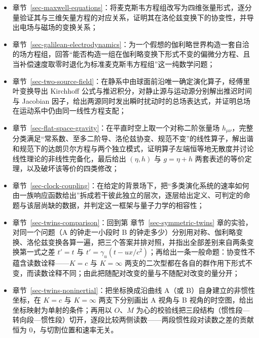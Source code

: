 \documentclass[
  chinese,
  a4paper,
  UTF8,
  12pt,
  oneside,
  openany]{ctexbook}
\theoremstyle{plain}
\theoremstyle{plain}
\theoremstyle{plain}
\theoremstyle{definition}
\theoremstyle{plain}
\theoremstyle{plain}
\theoremstyle{remark}
\begin{document}
\begin{itemize}
  章节~\ref{sec-quantum-phase}：只走纯量子相态------取定
  \(K\to\infty\)、\(\vec\nabla K=0\)，从恒速群出发，经李代数收缩、射影表示与中央扩张推出量子力学的核心骨架：静能
  \(mK^{2}\) 的发散与结构常数 \(1/K^{2}\)
  的消失相抵，产生唯一的中央扩张（\(H^{2}(\mathfrak{gal},\mathbb R)=\mathbb R\)，代表元
  \(c(\hat B_i,\hat P_j)=\delta_{ij}\)），中央荷即质量
  \(m\)（中心元素而非 Casimir 本征值，由此得质量超选择），位置算符定义为
  boost 生成元每单位质量，解出
  \([\hat q_i,\hat P_j]=i\hbar\delta_{ij}\)；再由
  Casimir、不变波动方程的相位抽取、德布罗意色散关系三条独立路线生成薛定谔方程；最后以反证法收口------Jacobi
  恒等式要求中央扩张存在当且仅当 \(\vec\nabla K=0\)，且
  \(\vec\nabla K\neq0\) 时相位抽取的残留项按 \(K_0^{2}\)
  发散并破坏幺正性，量子力学与引力是定义域不相交的两个相态；
\item
  章节~\ref{sec-maxwell-equations}：将麦克斯韦方程组改写为四维张量形式，逐分量验证其与三维矢量方程的对应关系，证明其在洛伦兹变换下的协变性，并导出电场与磁场的变换关系；
\item
  章节~\ref{sec-galilean-electrodynamics}：为一个假想的伽利略世界构造一套自洽的场方程组，回答``能否构造一组在伽利略变换下形式不变的偏微分方程、且当补偿速度取零时退化为标准麦克斯韦方程组''这一纯数学问题；
\item
  章节~\ref{sec-two-source-field}：在静系中由球面前沿唯一确定演化算子，经傅里叶变换导出
  Kirchhoff 公式与推迟积分，对静止源与运动源分别解出推迟时间与 Jacobian
  因子，给出两源同时发出瞬时扰动时的总场表达式，并证明总场在运动系中仍由同一线性方程支配；
\item
  章节~\ref{sec-flat-space-gravity}：在平直时空上取一个对称二阶张量场
  \(h_{\mu\nu}\)，完整分类满足``常系数、至多二阶导、洛伦兹协变、规范不变''的线性算子，解出谐和规范下的达朗贝尔方程与两个独立模式，证明算子左端恒等地无散度并讨论线性理论的非线性完备化，最后给出
  \((\eta,h)\) 与 \(g=\eta+h\)
  两套表述的等价定理，以及破坏该等价的四类修改；
\item
  章节~\ref{sec-clock-coupling}：在给定的背景场下，把``多类演化系统的速率如何由一族响应函数给出''拆成若干彼此独立的层次，逐层给出定义、可判定的命题与该层尚缺的数据，并判定这一框架与量子力学的相容性；
\item
  章节~\ref{sec-twins-comparison}：回到第 章节~\ref{sec-symmetric-twins}
  章的实验，对同一个问题（A 的钟走一小段时 B
  的钟走多少）分别用对称、伽利略变换、洛伦兹变换各算一遍，把三个答案并排对照，并指出全部差别来自两条变换第一式之差
  \(t'=t\) 与
  \(t'=\gamma_u(t-ux/c^{2})\)；再给出一条一般命题：协变性不蕴含读数诠释------\(K=c\)
  与 \(K=\infty\)
  两支的二次型都在各自的群作用下形式不变，而读数诠释不同；由此把随配对改变的量与不随配对改变的量分开；
\item
  章节~\ref{sec-twins-noninertial}：把坐标换成沿曲线 A（或
  B）自身建立的非惯性坐标，在 \(K=c\) 与 \(K=\infty\) 两支下分别画出 A
  视角与 B 视角的时空图，给出坐标映射为单射的条件；再用以 \(O\)、\(M\)
  为心的校验线把三段结构（惯性段---转向段---惯性段）切开，逐段比较两侧读数------两段惯性段对读数之差的贡献恒为
  \(0\)，与切割位置和速率无关。
\end{itemize}
\end{document}
